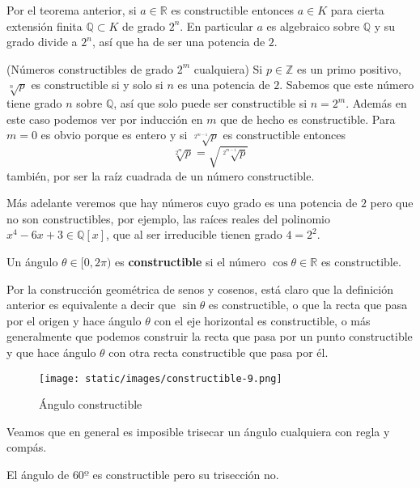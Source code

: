 
Por el teorema anterior, si \(a\in \mathbb R\) es constructible entonces
\(a\in K\) para cierta extensión finita \(\mathbb{Q}\subset K\) de grado
\(2^n\). En particular \(a\) es algebraico sobre \(\mathbb Q\) y su
grado divide a \(2^n\), así que ha de ser una potencia de \(2\).

\textrm{\normalfont (Números constructibles de grado $2^m$ cualquiera)}
Si \(p\in\mathbb Z\) es un primo positivo, \(\sqrt[n]{p}\) es
constructible si y solo si \(n\) es una potencia de \(2\). Sabemos que
este número tiene grado \(n\) sobre \(\mathbb Q\), así que solo puede
ser constructible si \(n=2^m\). Además en este caso podemos ver por
inducción en \(m\) que de hecho es constructible. Para \(m=0\) es obvio
porque es entero y si \(\sqrt[2^{m-1}]{p}\) es constructible entonces
\[\sqrt[2^m]{p}=\sqrt{\sqrt[2^{m-1}]{p}}\] también, por ser la raíz
cuadrada de un número constructible. 


Más adelante veremos que hay números cuyo grado es una potencia de \(2\)
pero que no son constructibles, por ejemplo, las raíces reales del
polinomio \(x^4-6x+3\in\mathbb{Q}[x]\), que al ser irreducible tienen
grado \(4=2^2\). 


Un ángulo \(\theta\in[0,2\pi)\) es \textbf{constructible} si el número
\(\cos \theta\in\mathbb R\) es constructible. 

Por la construcción geométrica de senos y cosenos, está claro que la
definición anterior es equivalente a decir que \(\sin \theta\) es
constructible, o que la recta que pasa por el origen y hace ángulo
\(\theta\) con el eje horizontal es constructible, o más generalmente
que podemos construir la recta que pasa por un punto constructible y que
hace ángulo \(\theta\) con otra recta constructible que pasa por él.

\begin{figure}
\centering
\texttt{[image: static/images/constructible-9.png]}
\caption{Ángulo constructible}
\end{figure}

Veamos que en general es imposible trisecar un ángulo cualquiera con
regla y compás.


El ángulo de \(60º\) es constructible pero su trisección no.

